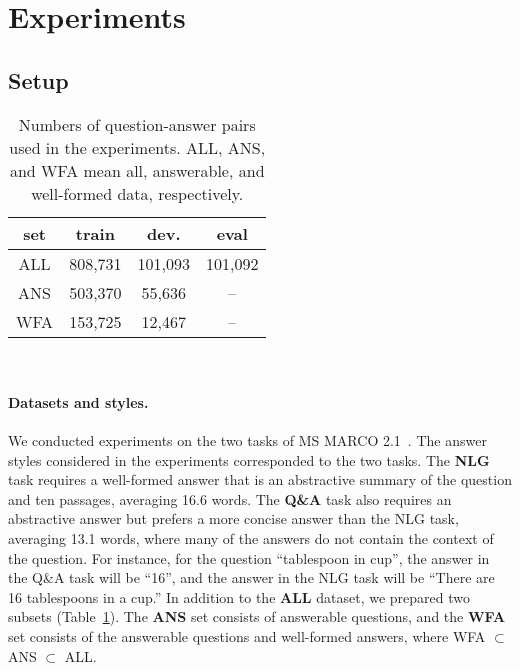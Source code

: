 \documentclass[11pt,a4paper]{article}
\theoremstyle{mydef}
\theoremstyle{myprob}
\begin{document}
\section{Experiments}

\subsection{Setup}


\begin{table}[t!]
\centering
{\small \tabcolsep=5pt
\begin{tabular}{c|ccc}
\hline
set   & train & dev. & eval \\ \hline
ALL & 808,731 & 101,093 & 101,092\\
ANS & 503,370 & 55,636 & --\\
WFA & 153,725 & 12,467 & --\\
\hline
\end{tabular} \\
}
\caption{Numbers of question-answer pairs used in the experiments. ALL, ANS, and WFA mean all, answerable, and well-formed data, respectively.}
\label{tb:data}
\end{table}


\paragraph{Datasets and styles.}
We conducted experiments on the two tasks
of MS MARCO 2.1~\citep{Bajaj18}.
The answer styles considered in the experiments corresponded to the two tasks.
The  \textbf{NLG} task requires a well-formed answer that is an abstractive summary of the question and ten passages, averaging 16.6 words.
The \textbf{Q\&A}  task also requires an abstractive answer but prefers a more concise answer than the NLG task, averaging 13.1 words, where many of the answers do not contain the context of the question.
For instance, for the question ``tablespoon in cup'', 
the answer in the Q\&A task will be ``16'', and 
the answer in the NLG task will be ``There are 16 tablespoons in a cup.''
In addition to the \textbf{ALL} dataset, we prepared two subsets (Table~\ref{tb:data}). The \textbf{ANS} set consists of answerable questions, and the \textbf{WFA} set consists of the answerable questions and well-formed answers, where WFA $\subset$ ANS $\subset$ ALL. 
\end{document}

